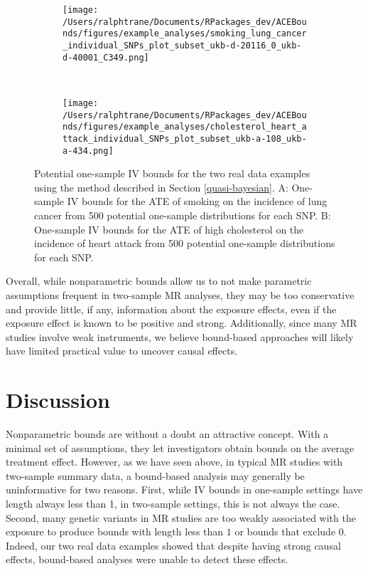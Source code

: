 \documentclass[
]{article}
\theoremstyle{plain}
\begin{document}
\begin{figure*}
  \centering
  \begin{subfigure}{0.5\linewidth}
  \centering
  \caption{}
  \texttt{[image: /Users/ralphtrane/Documents/RPackages\_dev/ACEBounds/figures/example\_analyses/smoking\_lung\_cancer\_individual\_SNPs\_plot\_subset\_ukb-d-20116\_0\_ukb-d-40001\_C349.png]}
  \label{fig:one-sample-bounds-smoking}
  \end{subfigure}%
  ~
  \begin{subfigure}{0.5\linewidth}
  \centering
  \caption{}
  \texttt{[image: /Users/ralphtrane/Documents/RPackages\_dev/ACEBounds/figures/example\_analyses/cholesterol\_heart\_attack\_individual\_SNPs\_plot\_subset\_ukb-a-108\_ukb-a-434.png]}
  \label{fig:one-sample-bounds-cholesterol}
  \end{subfigure}
  \caption{Potential one-sample IV bounds for the two real data examples using the method described in Section \ref{quasi-bayesian}. A: One-sample IV bounds for the ATE of smoking on the incidence of lung cancer from 500 potential one-sample distributions for each SNP. B: One-sample IV bounds for the ATE of high cholesterol on the incidence of heart attack from 500 potential one-sample distributions for each SNP.}
  \label{fig:one-sample-bounds}
\end{figure*}

Overall, while nonparametric bounds allow us to not make parametric assumptions frequent in two-sample MR analyses, they may be too conservative and provide little, if any, information about the exposure effects, even if the exposure effect is known to be positive and strong. Additionally, since many MR studies involve weak instruments, we believe bound-based approaches will likely have limited practical value to uncover causal effects.

\hypertarget{discussion}{%
\section{\texorpdfstring{Discussion \label{conclusion-and-practical-considerations}}{Discussion }}\label{discussion}}

Nonparametric bounds are without a doubt an attractive concept. With a minimal set of assumptions, they let investigators obtain bounds on the average treatment effect. However, as we have seen above, in typical MR studies with two-sample summary data, a bound-based analysis may generally be uninformative for two reasons. First, while IV bounds in one-sample settings have length always less than 1, in two-sample settings, this is not always the case. Second, many genetic variants in MR studies are too weakly associated with the exposure to produce bounds with length less than \(1\) or bounds that exclude \(0\). Indeed, our two real data examples showed that despite having strong causal effects, bound-based analyses were unable to detect these effects.
\end{document}
